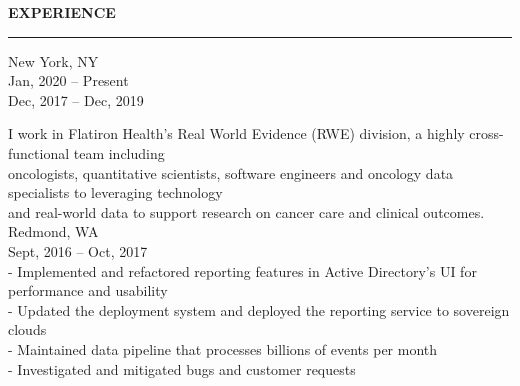 \documentclass{resume} %
\begin{document}

\medskip
\MakeUppercase{\bf Experience}
\medskip
\hrule

\hspace*{1mm}{\bf Flatiron Health } \hfill New York, NY \\
\hspace*{1mm}{\em Senior Software Engineer, Real World Evidence } \hfill Jan, 2020 -- Present \\
\hspace*{1mm}{\em Software Engineer, Real World Evidence } \hfill Dec, 2017 -- Dec, 2019

\hspace*{3mm}I work in Flatiron Health's Real World Evidence (RWE) division, a highly cross-functional team including \\
\hspace*{3mm}oncologists, quantitative scientists, software engineers and oncology data specialists to leveraging technology \\
\hspace*{3mm}and real-world data to support research on cancer care and clinical outcomes. \\




\hspace*{1mm}{\bf Microsoft } \hfill Redmond, WA \\
\hspace*{1mm}{\em Software Engineer, Azure Active Directory Reporting } \hfill Sept, 2016 -- Oct, 2017 \\
\hspace*{3mm}- Implemented and refactored reporting features in Active Directory’s UI for performance and usability \\
\hspace*{3mm}- Updated the deployment system and deployed the reporting service to sovereign clouds \\
\hspace*{3mm}- Maintained data pipeline that processes billions of events per month \\
\hspace*{3mm}- Investigated and mitigated bugs and customer requests
\end{document}
